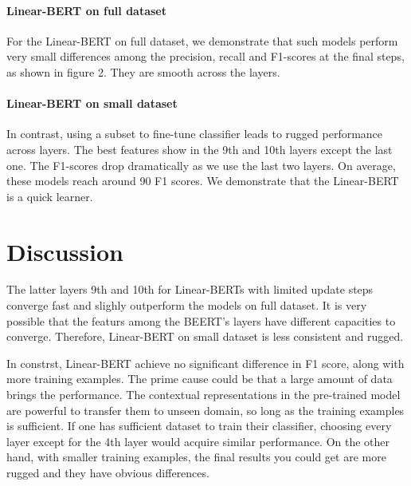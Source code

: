 \documentclass[11pt,a4paper]{article}
\begin{document}
\paragraph{Linear-BERT on full dataset}
For the Linear-BERT on full dataset, we demonstrate that such models perform very small differences among the precision, recall and F1-scores at the final steps, as shown in figure 2. They are smooth across the layers.


\paragraph{Linear-BERT on small dataset}
In contrast, using a subset to fine-tune classifier leads to rugged performance across layers. The best features show in the 9th and 10th layers except the last one. The F1-scores drop dramatically as we use the last two layers. On average, these models reach around 90 F1 scores. 
We demonstrate that the Linear-BERT is a quick learner.



\section{Discussion}
The latter layers 9th and 10th for Linear-BERTs with limited update steps converge fast and slighly outperform the models on full dataset. It is very possible that the featurs among the BEERT's layers have different capacities to converge. Therefore, Linear-BERT on small dataset is less consistent and rugged.

In constrst, Linear-BERT achieve no significant difference in F1 score, along with more training examples. The prime cause could be that a large amount of data brings the performance. The contextual representations in the pre-trained model are powerful to transfer them to unseen domain, so long as the training examples is sufficient. If one has sufficient dataset to train their classifier, choosing every layer except for the 4th layer would acquire similar performance. On the other hand, with smaller training examples, the final results you could get are more rugged and they have obvious differences.
\end{document}
